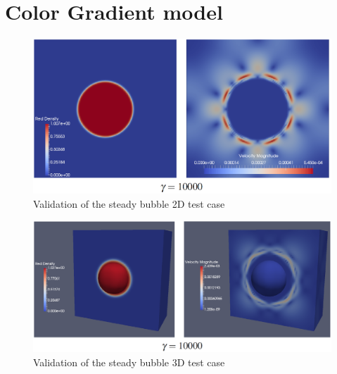 \documentclass[12pt, openany]{book}
\begin{document}
\section{Color Gradient model}

    \begin{figure}[H]
    	\centering
    	\includegraphics[width=\linewidth]{Resources/Images/AntonioValid/SteadyBubble.PNG}
    	\caption{Validation of the steady bubble 2D test case}
    	\label{fig:steadbub}
    \end{figure}
    
    \begin{figure}[H]
    	\centering
    	\includegraphics[width=\linewidth]{Resources/Images/AntonioValid/SteadyBubble3D.PNG}
    	\caption{Validation of the steady bubble 3D test case}
    	\label{fig:steadbub3d}
    \end{figure}
        
\end{document}
